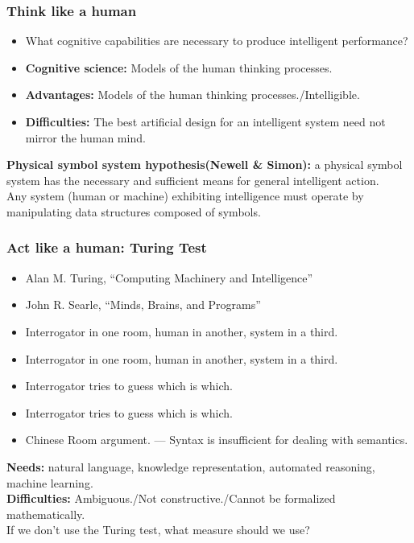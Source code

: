 \documentclass[UTF8,11pt,colorlinks,compress,openany]{beamer}%
\begin{document}
\begin{frame}\frametitle{Think like a human}
\begin{itemize}
	\item What cognitive capabilities are necessary to produce intelligent performance?
	\item \textbf{Cognitive science:} Models of the human thinking processes.
	\item \textbf{Advantages:} Models of the human thinking processes./Intelligible.
	\item \textbf{Difficulties:} The best artificial design for an intelligent system need not mirror the human mind.
\end{itemize}
\textbf{Physical symbol system hypothesis(Newell \& Simon):} a physical symbol system has the necessary and sufficient means for general intelligent action.\\
Any system (human or machine) exhibiting intelligence must operate by manipulating data structures composed of symbols.
\end{frame}

\begin{frame}\frametitle{Act like a human: Turing Test}
\begin{itemize}
	\item Alan M. Turing, ``Computing Machinery and Intelligence''
	\item John R. Searle, ``Minds, Brains, and Programs''
\end{itemize}
\begin{itemize}
	\item Interrogator in one room, human in another, system in a third.
	\item Interrogator in one room, human in another, system in a third.
	\item Interrogator tries to guess which is which.
	\item Interrogator tries to guess which is which.
	\item Chinese Room argument. --- Syntax is insufficient for dealing with semantics.
\end{itemize}
\textbf{Needs:} natural language, knowledge representation, automated reasoning, machine learning.\\
\textbf{Difficulties:} Ambiguous./Not constructive./Cannot be formalized mathematically.\\
\centering If we don't use the Turing test, what measure should we use?
\end{frame}
\end{document}
